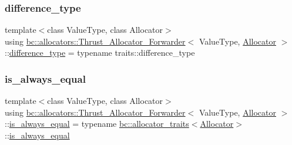 \subsubsection{\texorpdfstring{difference\+\_\+type}{difference\_type}}
{\footnotesize\ttfamily template$<$class Value\+Type, class Allocator$>$ \\
using \hyperlink{structbc_1_1allocators_1_1Thrust__Allocator__Forwarder}{bc\+::allocators\+::\+Thrust\+\_\+\+Allocator\+\_\+\+Forwarder}$<$ Value\+Type, \hyperlink{classbc_1_1allocators_1_1Allocator}{Allocator} $>$\+::\hyperlink{structbc_1_1allocators_1_1Thrust__Allocator__Forwarder_a9e16371c961dd61923bc88863d76846f}{difference\+\_\+type} =  typename traits\+::difference\+\_\+type}

\mbox{\label{structbc_1_1allocators_1_1Thrust__Allocator__Forwarder_a7d6bdf9ea4c72a889c2af0a8b1deb643}} 
\subsubsection{\texorpdfstring{is\+\_\+always\+\_\+equal}{is\_always\_equal}}
{\footnotesize\ttfamily template$<$class Value\+Type, class Allocator$>$ \\
using \hyperlink{structbc_1_1allocators_1_1Thrust__Allocator__Forwarder}{bc\+::allocators\+::\+Thrust\+\_\+\+Allocator\+\_\+\+Forwarder}$<$ Value\+Type, \hyperlink{classbc_1_1allocators_1_1Allocator}{Allocator} $>$\+::\hyperlink{structbc_1_1allocators_1_1Thrust__Allocator__Forwarder_a7d6bdf9ea4c72a889c2af0a8b1deb643}{is\+\_\+always\+\_\+equal} =  typename \hyperlink{structbc_1_1allocators_1_1allocator__traits}{bc\+::allocator\+\_\+traits}$<$\hyperlink{classbc_1_1allocators_1_1Allocator}{Allocator}$>$\+::\hyperlink{structbc_1_1allocators_1_1Thrust__Allocator__Forwarder_a7d6bdf9ea4c72a889c2af0a8b1deb643}{is\+\_\+always\+\_\+equal}}

\mbox{\label{structbc_1_1allocators_1_1Thrust__Allocator__Forwarder_ad65c1d99f764c14eb0f65dc78d36e56a}} 
